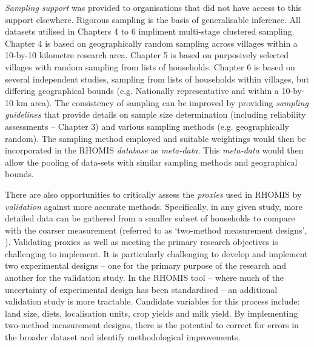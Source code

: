 \textit{Sampling support} was provided to organisations that did not have access to this support elsewhere. Rigorous sampling
is the basis of generalisable inference. All datasets utilised in Chapters 4 to 6 impliment multi-stage clustered sampling. Chapter 4 is based on geographically random sampling across villages within a 10-by-10 kilometre research area. Chapter 5 is based on purposively selected villages with random sampling from lists of households. Chapter 6 is based on several independent studies, sampling from lists of households within villages, but differing geographical bounds (e.g. Nationally representative and within a 10-by-10 km area). The consistency of sampling can be improved by providing \textit{sampling guidelines} that provide details on sample size determination (including reliability assessments -- Chapter 3) and various sampling methods (e.g. geographically random). The sampling method employed and suitable weightings would then be incorporated in the RHOMIS \textit{database} as \textit{meta-data}. This \textit{meta-data} would then allow the pooling of data-sets with similar sampling methods and geographical bounds.

There are also opportunities to critically assess the \textit{proxies} used in RHOMIS by \textit{validation} against more accurate methods. Specifically, in any given study, more detailed data can be gathered from a smaller subset of households to compare with the coarser measurement (referred to as `two-method measurement designs', \citealp{Little2013}). Validating proxies as well as meeting the primary research objectives is challenging to implement. It is particularly challenging to develop and implement two experimental designs -- one for the primary purpose of the research and another for the validation study. In the RHOMIS tool -- where much of the uncertainty of experimental design has been standardised -- an additional validation study is more tractable. Candidate variables for this process include: land size, diets, localisation units, crop yields and milk yield. By implementing two-method measurement designs, there is the potential to correct for errors in the broader dataset and identify methodological improvements.

